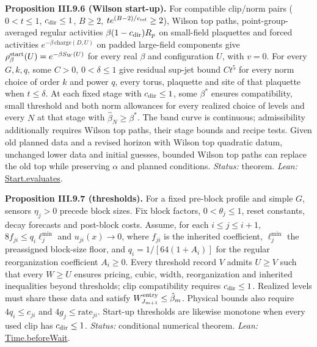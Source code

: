 \documentclass[
  letterpaper,
  11pt]{article}
\begin{document}
\textbf{Proposition III.9.6 (Wilson start-up).} For compatible clip/norm
pairs (\(0<t\le1\), \(c_{\rm dir}\le1\), \(B\ge2\),
\(te^{(B-2)/c_{\rm rel}}\ge2\)), Wilson top paths, point-group-averaged
regular activities \(\beta(1-c_{\rm dir})R_p\) on small-field plaquettes
and forced activities \(e^{-\beta\,\mathrm{charge}(D,U)}\) on padded
large-field components give
\(\rho^{\rm start}_\beta(U)=e^{-\beta S_W(U)}\) for every real \(\beta\)
and configuration \(U\), with \(v=0\). For every \(G,k,q\), some
\(C>0\), \(0<\delta\le1\) give residual sup-jet bound \(Ct^5\) for every
norm choice of order \(k\) and power \(q\), every torus, plaquette and
site of that plaquette when \(t\le\delta\). At each fixed stage with
\(c_{\rm dir}\le1\), some \(\beta^*\) ensures compatibility, small
threshold and both norm allowances for every realized choice of levels
and every \(N\) at that stage with \(\hat\beta_N\ge\beta^*\). The band
curve is continuous; admissibility additionally requires Wilson top
paths, their stage bounds and recipe tests. Given old planned data and a
revised horizon with Wilson top quadratic datum, unchanged lower data
and initial guesses, bounded Wilson top paths can replace the old top
while preserving \(\alpha\) and planned conditions. \emph{Status:}
theorem. \emph{Lean:}
\href{https://github.com/yang-mills-group/OpenAI-YM-20261028/blob/3456e5e75cf8d4cd558955a5c7638fba2d68f464/YM/Extra/WILSON_STARTUP/Gas.lean\#L96-L103}{Start.evaluates}.

\textbf{Proposition III.9.7 (thresholds).} For a fixed pre-block profile
and simple \(G\), sensors \(\eta_j>0\) precede block sizes. Fix block
factors, \(0<\theta_j\le1\), reset constants, decay forecasts and
post-block costs. Assume, for each \(i\le j\le i+1\),
\(8f_{ji}\le q_i\ell_j^{\min}\) and \(u_{ji}(x)\to0\), where \(f_{ji}\)
is the inherited coefficient, \(\ell_j^{\min}\) the preassigned
block-size floor, and \(q_i=1/[64(1+A_i)]\) for the regular
reorganization coefficient \(A_i\ge0\). Every threshold record \(V\)
admits \(U\ge V\) such that every \(W\ge U\) ensures pricing, cubic,
width, reorganization and inherited inequalities beyond thresholds; clip
compatibility requires \(c_{\rm dir}\le1\). Realized levels must share
these data and satisfy \(W^{\rm entry}_{J_{m+1}}\le\hat\beta_m\).
Physical bounds also require \(4q_i\le c_{ji}\) and
\(4g_j\le\mathrm{rate}_{ji}\). Start-up thresholds are likewise monotone
when every used clip has \(c_{\rm dir}\le1\). \emph{Status:} conditional
numerical theorem. \emph{Lean:}
\href{https://github.com/yang-mills-group/OpenAI-YM-20261028/blob/3456e5e75cf8d4cd558955a5c7638fba2d68f464/YM/AnalyticBridge/VERIFIED_RESET_STEP/Inherited.lean\#L75-L89}{Time.beforeWait}.
\end{document}
